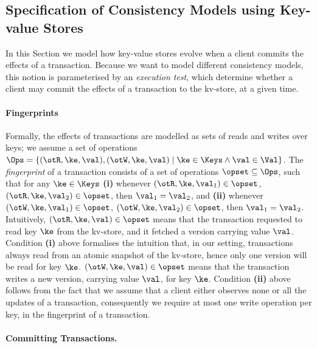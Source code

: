 \subsection{Specification of Consistency Models using Key-value Stores}
\label{sec:execution.tests}

In this Section we model how key-value stores evolve when a client commits 
the effects of a transaction. Because we want to model different consistency models, 
this notion is parameterised by an \emph{execution test}, which determine whether 
a client may commit the effects of a transaction to the kv-store, at a given time.

\paragraph{Fingerprints} 
Formally, the effects of transactions are modelled as sets of reads and writes 
over keys; we assume a set of operations $\Ops = \{(\otR, \ke, \val), (\otW, \ke, \val) \mid \ke \in \Keys \wedge 
\val \in \Val \}$. The \emph{fingerprint} of a transaction consists of a 
set of operations $\opset \subseteq \Ops$, such that for any $\ke \in \Keys$ 
\textbf{(i)} whenever $(\otR, \ke, \val_1) \in \opset$, $(\otR, \ke, \val_2) \in \opset$, then $\val_1 = \val_2$, 
and \textbf{(ii)} whenever $(\otW, \ke, \val_1) \in \opset$, $(\otW, \ke, \val_2) \in \opset$, then $\val_1 = \val_2$. 
Intuitively, $(\otR, \ke, \val) \in \opset$ means that the transaction requested to read key $\ke$ from the kv-store, 
and it fetched a version carrying value $\val$. Condition \textbf{(i)} above formalises the intuition that, in our setting, 
transactions always read from an atomic snapshot of the kv-store, hence only one version will be read for key $\ke$. 
$(\otW, \ke, \val) \in \opset$ means that the transaction writes a new version, carrying value $\val$, for key $\ke$. 
Condition \textbf{(ii)} above follows from the fact that we assume that a client either observes none or all the updates 
of a transaction, consequently we require at most one write operation per key, in the fingerprint of a transaction. 

\paragraph{Committing Transactions.}

